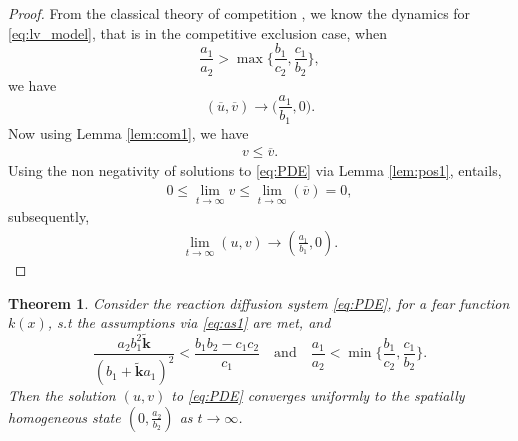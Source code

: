 \documentclass[10pt]{amsart}
\newtheorem{theorem}{Theorem}[section]
\theoremstyle{definition}
\begin{document}
\begin{proof}

	From the classical theory of competition \cite{Murray93}, we know the dynamics for \eqref{eq:lv_model}, that is in the competitive exclusion case, when
	\[  \dfrac{a_1}{a_2} > \max \Big\{ \dfrac{b_1}{c_2},\dfrac{c_1}{b_2}  \Big \} , \]
	we have 
	\[ (\overline{u},\overline{v}) \to \Big(\dfrac{a_1}{b_1},0\Big).\]
	 Now using Lemma \ref{lem:com1}, we have
	\begin{align*}
	 v    \leq \overline{v}.
	\end{align*}
	 Using the non negativity of solutions to \eqref{eq:PDE} via Lemma \ref{lem:pos1}, entails,
	\begin{align*}
	 0 \leq \lim_{t \rightarrow \infty} v    \leq \lim_{t \rightarrow \infty} (\overline{v}) = 0,
	\end{align*}
	subsequently,
	\begin{align*}
		  \lim_{t \rightarrow \infty}   (u,v)    \rightarrow 	\left(\frac{a_{1}}{b_{1}},0\right).
	\end{align*}
	
\end{proof}






\begin{theorem}\label{thm:ce_2_pde}
	Consider the reaction diffusion system \eqref{eq:PDE}, for a fear function $k(x)$, s.t the assumptions via \eqref{eq:as1} are met, and
	\[ \dfrac{a_2 b_1^2 \mathbf{\widetilde{k}}}{(b_1 + \mathbf{\widetilde{k}} a_1)^2}< \dfrac{b_1 b_2 - c_1 c_2}{c_1} \quad \text{and} \quad \dfrac{a_1}{a_2} < \min \Big\{ \dfrac{b_1}{c_2},\dfrac{c_1}{b_2}  \Big\}. \]
Then the solution $(u,v)$ to \eqref{eq:PDE}  converges uniformly to the spatially homogeneous state $(0, \frac{a_{2}}{b_{2}})$ as $t \to \infty$.
\end{theorem}
\end{document}
